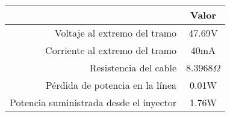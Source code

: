 \begin{tabular}{|r|c|}
  \hline
  \rowcolor[HTML]{E3FFE3} 
  \multicolumn{1}{|c|}{\cellcolor[HTML]{E3FFE3}Parámetro} & Valor \\
  \hline
  Voltaje al extremo del tramo & 47.69V \\
  \hline
  Corriente al extremo del tramo & 40mA \\
  \hline
  Resistencia del cable & 8.3968$ \Omega $ \\
  \hline
  Pérdida de potencia en la línea & 0.01W \\
  \hline
  Potencia suministrada desde el inyector & 1.76W \\
  \hline
\end{tabular}